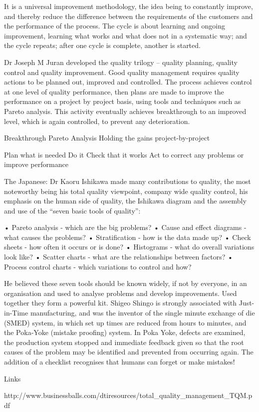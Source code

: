 It is a universal improvement methodology, the idea being to constantly improve, and thereby reduce the  difference between the requirements of the customers and the performance of the process. The cycle is about learning and ongoing improvement, learning what works and what does not in a systematic way; and the cycle repeats; after one cycle is complete, another is started.
 
Dr Joseph M Juran developed the quality trilogy – quality planning, quality control and quality  improvement. Good quality management requires quality actions to be planned out, improved and controlled. The process achieves control at one level of quality performance, then plans are made to improve the performance on a project by project basis, using tools and techniques such as Pareto analysis. This activity eventually achieves breakthrough to an improved level, which is again controlled, to prevent any deterioration.
 
Breakthrough Pareto Analysis
Holding the gains
project-by-project
 
Plan what is needed
Do it
Check that it works
Act to correct any problems or improve performance
 
The Japanese:
Dr Kaoru Ishikawa made many contributions to quality, the most noteworthy being his total quality viewpoint, company wide quality control, his emphasis on the human side of quality, the Ishikawa diagram and the assembly and use of the “seven basic tools of quality”:
 
• Pareto analysis - which are the big problems?
• Cause and effect diagrams - what causes the problems?
• Stratification - how is the data made up?
• Check sheets - how often it occurs or is done?
• Histograms  - what do overall variations look like?
• Scatter charts  - what are the relationships between factors?
• Process control charts - which variations to control and how?
 
He believed these seven tools should be known widely, if not by everyone, in an organisation and used to analyse problems and develop improvements. Used together they form a powerful kit. Shigeo Shingo is strongly associated with Just-in-Time manufacturing, and was the inventor of the single minute exchange of die (SMED) system, in which set up times are reduced from hours to minutes, and the Poka-Yoke (mistake proofing) system. In Poka Yoke, defects are examined, the production system stopped and immediate feedback given so that the root causes of the problem may be identified and prevented from occurring again. The addition of a checklist recognises that humans can forget or make mistakes!
 
Links
 
http://www.businessballs.com/dtiresources/total_quality_management_TQM.pdf
 
 
